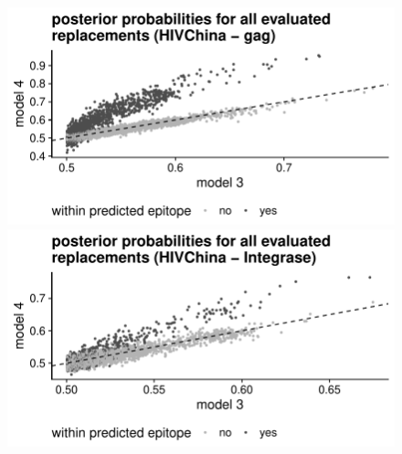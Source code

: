 \documentclass[a4paper,11pt]{article}
\begin{document}
\begin{figure}[H]
    \begin{minipage}{.49\textwidth}
      \includegraphics[width=\linewidth]{plots/posterior_p/hiv_china/gag.pdf}
    \end{minipage}%
    \begin{minipage}{.49\textwidth}
      \includegraphics[width=\linewidth]{plots/posterior_p/hiv_china/integrase.pdf}
    \end{minipage}
  
    \vspace{0.5cm}
  

\end{figure}
\end{document}
